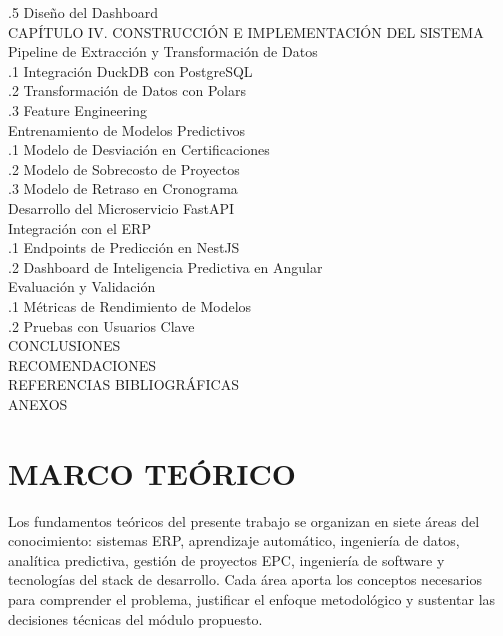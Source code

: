 \documentclass{univalle-perfil}
\begin{document}
\begin{indicetentativo}
\quad{}.5 Diseño del Dashboard \\[2pt]
CAPÍTULO IV. CONSTRUCCIÓN E IMPLEMENTACIÓN DEL SISTEMA \\
 Pipeline de Extracción y Transformación de Datos \\
\quad{}.1 Integración DuckDB con PostgreSQL \\
\quad{}.2 Transformación de Datos con Polars \\
\quad{}.3 Feature Engineering \\
 Entrenamiento de Modelos Predictivos \\
\quad{}.1 Modelo de Desviación en Certificaciones \\
\quad{}.2 Modelo de Sobrecosto de Proyectos \\
\quad{}.3 Modelo de Retraso en Cronograma \\
 Desarrollo del Microservicio FastAPI \\
 Integración con el ERP \\
\quad{}.1 Endpoints de Predicción en NestJS \\
\quad{}.2 Dashboard de Inteligencia Predictiva en Angular \\
 Evaluación y Validación \\
\quad{}.1 Métricas de Rendimiento de Modelos \\
\quad{}.2 Pruebas con Usuarios Clave \\[2pt]
CONCLUSIONES \\
RECOMENDACIONES \\
REFERENCIAS BIBLIOGRÁFICAS \\
ANEXOS
\end{indicetentativo}

\section{MARCO TEÓRICO}

Los fundamentos teóricos del presente trabajo se organizan en siete áreas del conocimiento: sistemas ERP, aprendizaje automático, ingeniería de datos, analítica predictiva, gestión de proyectos EPC, ingeniería de software y tecnologías del stack de desarrollo. Cada área aporta los conceptos necesarios para comprender el problema, justificar el enfoque metodológico y sustentar las decisiones técnicas del módulo propuesto.
\end{document}
